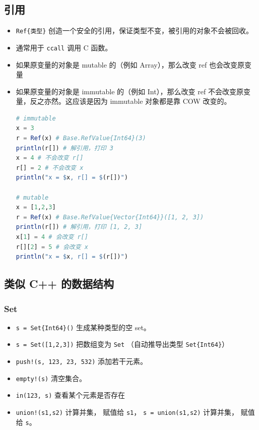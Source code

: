 \subsection{引用}
\begin{itemize}
\item \verb`Ref{类型}` 创造一个安全的引用，保证类型不变，被引用的对象不会被回收。
\item 通常用于 \verb`ccall` 调用 C 函数。
\item 如果原变量的对象是 mutable 的（例如 Array），那么改变 ref 也会改变原变量
\item 如果原变量的对象是 immutable 的（例如 Int），那么改变 ref 不会改变原变量，反之亦然。这应该是因为 immutable 对象都是靠 COW 改变的。
\begin{lstlisting}[language=julia]
# immutable
x = 3
r = Ref(x) # Base.RefValue{Int64}(3)
println(r[]) # 解引用，打印 3
x = 4 # 不会改变 r[]
r[] = 2 # 不会改变 x
println("x = $x, r[] = $(r[])")

# mutable
x = [1,2,3]
r = Ref(x) # Base.RefValue{Vector{Int64}}([1, 2, 3])
println(r[]) # 解引用，打印 [1, 2, 3]
x[1] = 4 # 会改变 r[]
r[][2] = 5 # 会改变 x
println("x = $x, r[] = $(r[])")
\end{lstlisting}
\end{itemize}


\subsection{类似 C++ 的数据结构}
\subsubsection{Set}
\begin{itemize}
\item \verb`s = Set{Int64}()` 生成某种类型的空 set。
\item \verb`s = Set([1,2,3])` 把数组变为 \verb`Set` （自动推导出类型 \verb`Set{Int64}`）
\item \verb`push!(s, 123, 23, 532)` 添加若干元素。
\item \verb`empty!(s)` 清空集合。
\item \verb`in(123, s)` 查看某个元素是否存在
\item \verb`union!(s1,s2)` 计算并集， 赋值给 \verb`s1`， \verb`s = union(s1,s2)` 计算并集， 赋值给 \verb`s`。
\end{itemize}

